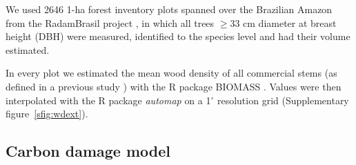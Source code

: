\documentclass{article}
\begin{document}
We used 2646 1-ha forest inventory plots spanned over the Brazilian Amazon from the RadamBrasil project \cite{Radam2017}, in which all trees $\geq$33 cm diameter at breast height (DBH) were measured, identified to the species level and had their volume estimated. 

In every plot we estimated the mean wood density of all commercial stems (as defined in a previous study \cite{Piponiot2019}) with the R package BIOMASS \cite{Rejou-Mechain2017}.
Values were then interpolated with the R package \textit{automap} \cite{gstat} on a 1$^{\circ}$ resolution grid (Supplementary figure~\ref{sfig:wdext}).


\subsection{Carbon damage model}
\label{supmat:cdam}
\end{document}
